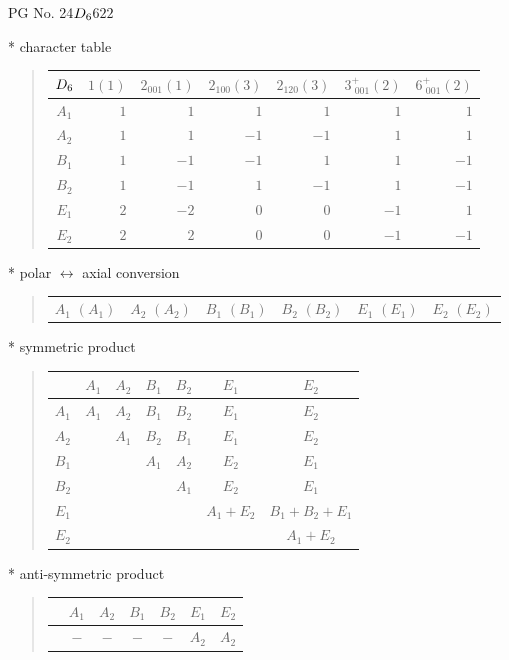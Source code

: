 \documentclass[fleqn,8pt,landscape]{jsarticle}
\begin{document}
\setcounter{MaxMatrixCols}{32}

\renewcommand{\tablename}{Table~}
\renewcommand{\figurename}{Figure~}
\begin{center}
\LARGE
PG No. 24\quad$D_{\rm 6}$\quad$622$\quad[ hexagonal ]
\end{center}

* character table
\begin{quote}
\begin{tabular}{crrrrrr} \hline \hline
$ D_{\rm 6} $ & $ 1(1) $ & $ 2{}_{001}(1) $ & $ 2{}_{100}(3) $ & $ 2{}_{120}(3) $ & $ 3^{+}_{\,\,001}(2) $ & $ 6^{+}_{\,\,001}(2) $ \\ \hline
$ A_{1} $ & $ 1 $ & $ 1 $ & $ 1 $ & $ 1 $ & $ 1 $ & $ 1 $ \\
$ A_{2} $ & $ 1 $ & $ 1 $ & $ -1 $ & $ -1 $ & $ 1 $ & $ 1 $ \\
$ B_{1} $ & $ 1 $ & $ -1 $ & $ -1 $ & $ 1 $ & $ 1 $ & $ -1 $ \\
$ B_{2} $ & $ 1 $ & $ -1 $ & $ 1 $ & $ -1 $ & $ 1 $ & $ -1 $ \\
$ E_{1} $ & $ 2 $ & $ -2 $ & $ 0 $ & $ 0 $ & $ -1 $ & $ 1 $ \\
$ E_{2} $ & $ 2 $ & $ 2 $ & $ 0 $ & $ 0 $ & $ -1 $ & $ -1 $ \\
 \hline \hline
\end{tabular}
\end{quote}

* polar $\leftrightarrow$ axial conversion
\begin{quote}
\begin{tabular}{cccccc}
$ A_{1}\,\,(A_{1}) $ & $ A_{2}\,\,(A_{2}) $ & $ B_{1}\,\,(B_{1}) $ & $ B_{2}\,\,(B_{2}) $ & $ E_{1}\,\,(E_{1}) $ & $ E_{2}\,\,(E_{2}) $
\end{tabular}
\end{quote}

* symmetric product
\begin{quote}
\begin{tabular}{c|cccccc} \hline \hline
 & $ A_{1} $ & $ A_{2} $ & $ B_{1} $ & $ B_{2} $ & $ E_{1} $ & $ E_{2} $ \\ \hline
$ A_{1} $ & $ A_{1} $ & $ A_{2} $ & $ B_{1} $ & $ B_{2} $ & $ E_{1} $ & $ E_{2} $ \\
$ A_{2} $ & $  $ & $ A_{1} $ & $ B_{2} $ & $ B_{1} $ & $ E_{1} $ & $ E_{2} $ \\
$ B_{1} $ & $  $ & $  $ & $ A_{1} $ & $ A_{2} $ & $ E_{2} $ & $ E_{1} $ \\
$ B_{2} $ & $  $ & $  $ & $  $ & $ A_{1} $ & $ E_{2} $ & $ E_{1} $ \\
$ E_{1} $ & $  $ & $  $ & $  $ & $  $ & $ A_{1} + E_{2} $ & $ B_{1} + B_{2} + E_{1} $ \\
$ E_{2} $ & $  $ & $  $ & $  $ & $  $ & $  $ & $ A_{1} + E_{2} $ \\
 \hline \hline
\end{tabular}
\end{quote}

* anti-symmetric product
\begin{quote}
\begin{tabular}{ccccccc} \hline \hline
 & $ A_{1} $ & $ A_{2} $ & $ B_{1} $ & $ B_{2} $ & $ E_{1} $ & $ E_{2} $ \\ \hline
$  $ & $ - $ & $ - $ & $ - $ & $ - $ & $ A_{2} $ & $ A_{2} $ \\
 \hline \hline
\end{tabular}
\end{quote}
\end{document}
